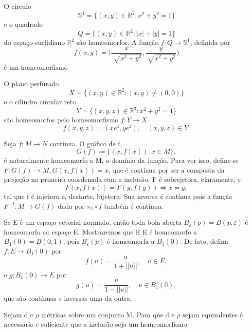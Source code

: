 \documentclass[MetricSpaces/metric_notes.tex]{subfiles}
\begin{document}
\begin{example}
	O círculo
	\[
		\mathbb{S}^{1}=\{(x, y)\in \mathbb{R}^{2}: x^{2}+y^{2}=1\}
	\]
	e o quadrado
	\[
		Q = \{(x, y)\in \mathbb{R}^{2}: |x|+|y|=1\}
	\]
	do espaço euclidiano \(\mathbb{R}^{2}\) são homeomorfos. A função \(f:Q\rightarrow \mathbb{S}^{1}\),
	definida por
	\[
		f(x, y) = \biggl(\frac{x}{\sqrt[]{x^{2}+y^{2}}}, \frac{y}{\sqrt[]{x^{2}+y^{2}}}\biggr)
	\]
	é um homeomorfismo
\end{example}
\begin{example}
	O plano perfurado
	\[
		X = \{(x, y)\in \mathbb{R}^{2}: (x, y)\neq(0, 0)\}
	\]
	e o cilindro circular reto
	\[
		Y = \{(x, y, z)\in \mathbb{R}^{3}: x^{2}+y^{2}=1\}
	\]
	são homeomorfos pelo homeomorfismo \(f:Y\rightarrow X\)
	\[
		f(x, y, z) = (x e^{z}, y e^{z}),\quad (x, y, z)\in Y.
	\]
\end{example}
\begin{example}
	Seja \(f:M\rightarrow N\) contínua. O gráfico de f,
	\[
		G(f)\coloneqq \{(x, f(x)): x\in M\},
	\]
	é naturalmente homeomorfo a M, o domínio da função. Para ver isso, define-se
	\(F:G(f)\rightarrow M, G(x, f(x))=x\), que é contínua por ser a composta da projeção na primeira coordenada com a inclusão.
	F é sobrejetora, claramente, e
	\[
		F(x, f(x)) = F(y, f(y)) \Longleftrightarrow x = y,
	\]
	tal que f é injetora e, destarte, bijetora. Sua inversa é contínua pois a função
	\(F^{-1}:M\rightarrow G(f)\) dada por \(\pi_{1}\circ{f}\) também é contínua.
\end{example}
\begin{example}
	Se E é um espaço vetorial normado, então toda bola aberta \(B_{\varepsilon }(p) = B(p, \varepsilon )\)
	é homeomorfa ao espaço E. Mostraremos que E E é homeomorfo a \(B_{1}(0) = B(0, 1)\), pois \(B_{\varepsilon }(p)\)
	é homeomorfa a \(B_{1}(0).\) De fato, defina \(f:E\rightarrow B_{1}(0)\) por
	\[
		f(u) = \frac{u}{1+||u||},\quad u\in E,
	\]
	e \(g:B_{1}(0)\rightarrow E\) por
	\[
		g(u) = \frac{u}{1-||u||},\quad u\in B_{1}(0),
	\]
	que são contínuas e inversas uma da outra.
\end{example}
\begin{prop*}
	Sejam d e \(\rho \) métricas sobre um conjunto M. Para que d e \(\rho \) sejam equivalentes é
	necessário e suficiente que a inclusão seja um homeomorfismo.
\end{prop*}
\end{document}
